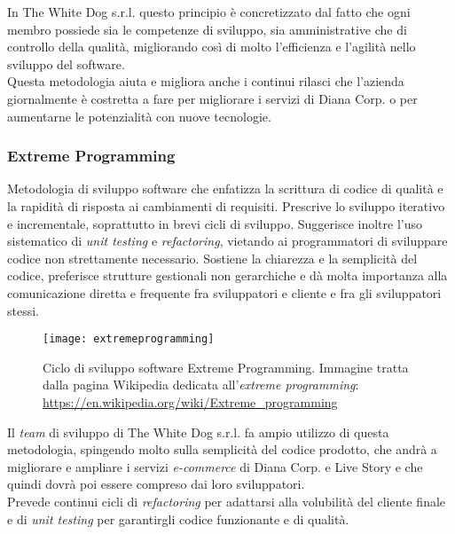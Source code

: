 In The White Dog s.r.l. questo principio è concretizzato dal fatto che ogni membro possiede sia le competenze di sviluppo, sia amministrative che di controllo della qualità, migliorando così di molto l'efficienza e l'agilità nello sviluppo del software. \\
Questa metodologia aiuta e migliora anche i continui rilasci che l'azienda giornalmente è costretta a fare per migliorare i servizi di Diana Corp. o per aumentarne le potenzialità con nuove tecnologie.

\subsubsection{Extreme Programming}

Metodologia di sviluppo software che enfatizza la scrittura di codice di qualità e la rapidità di risposta ai cambiamenti di requisiti. Prescrive lo sviluppo iterativo e incrementale, soprattutto in brevi cicli di sviluppo. Suggerisce inoltre l'uso sistematico di \textit{unit testing} e \textit{refactoring}, vietando ai programmatori di sviluppare codice non strettamente necessario. Sostiene la chiarezza e la semplicità del codice, preferisce strutture gestionali non gerarchiche e dà molta importanza alla comunicazione diretta e frequente fra sviluppatori e cliente e fra gli sviluppatori stessi. 

\label{Extreme Programming}
\begin{figure}[ht]
	\begin{center}
		\texttt{[image: extremeprogramming]}
		\caption{Ciclo di sviluppo software Extreme Programming. Immagine tratta dalla pagina Wikipedia dedicata all'\textit{extreme programming}: \url{https://en.wikipedia.org/wiki/Extreme_programming}}
	\end{center}
\end{figure}
\FloatBarrier

Il \textit{team} di sviluppo di The White Dog s.r.l. fa ampio utilizzo di questa metodologia, spingendo molto sulla semplicità del codice prodotto, che andrà a migliorare e ampliare i servizi \textit{e-commerce} di Diana Corp. e Live Story e che quindi dovrà poi essere compreso dai loro sviluppatori. \\
Prevede continui cicli di \textit{refactoring} per adattarsi alla volubilità del cliente finale e di \textit{unit testing} per garantirgli codice funzionante e di qualità.

